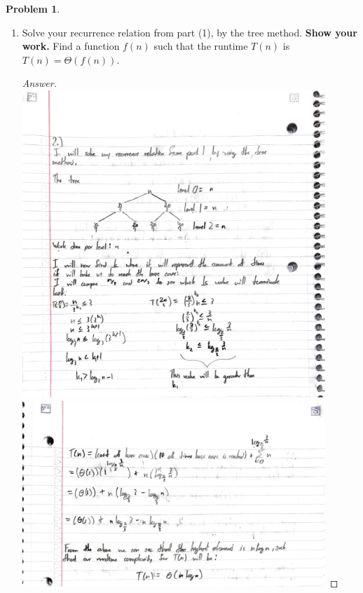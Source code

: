 \documentclass[11pt]{article}
\theoremstyle{definition}
\theoremstyle{definition}
\newtheorem{required}{Problem}
\theoremstyle{definition}
\begin{document}
\begin{required}
\begin{enumerate}
\item Solve your recurrence relation from part (1), by the tree method. \textbf{Show your work.}  Find a function $f(n)$ such that the runtime $T(n)$ is $T(n) = \Theta(f(n))$.
\begin{proof}[Answer]
\includegraphics[width=0.9\textwidth]{M2S20P2P1.pdf} \\
\includegraphics[width=0.9\textwidth]{M2S20P2P2.pdf}

\end{proof}

\newpage


\end{enumerate}
\end{required}
\end{document}
